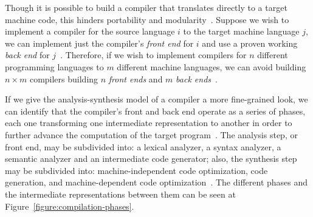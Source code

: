 \documentclass[
    oneside,
    english,
    embeddedlogo,
    noabntexcite
]{ufsc-thesis-rn46-2019}
\begin{document}
Though it is possible to build a compiler that translates directly to a target machine code, this hinders portability and modularity~\cite{appel2003modern}.
Suppose we wish to implement a compiler for the source language $i$ to the target machine language $j$, we can implement just the compiler's \textit{front end} for $i$ and use a proven working \textit{back end} for $j$~\cite{Aho:2006:CPT:1177220}.
Therefore, if we wish to implement compilers for $n$ different programming languages to $m$ different machine languages, we can avoid building $n \times m$ compilers building $n$ \textit{front ends} and $m$ \textit{back ends}~\cite{Aho:2006:CPT:1177220}.

If we give the analysis-synthesis model of a compiler a more fine-grained look, we can identify that the compiler's front and back end operate as a series of phases, each one transforming one intermediate representation to another in order to further advance the computation of the target program~\cite{Aho:2006:CPT:1177220}.
The analysis step, or front end, may be subdivided into: a lexical analyzer, a syntax analyzer, a semantic analyzer and an intermediate code generator; also, the synthesis step may be subdivided into: machine-independent code optimization, code generation, and machine-dependent code optimization~\cite{Aho:2006:CPT:1177220}.
The different phases and the intermediate representations between them can be seen at Figure~\ref{figure:compilation-phases}.
\end{document}
